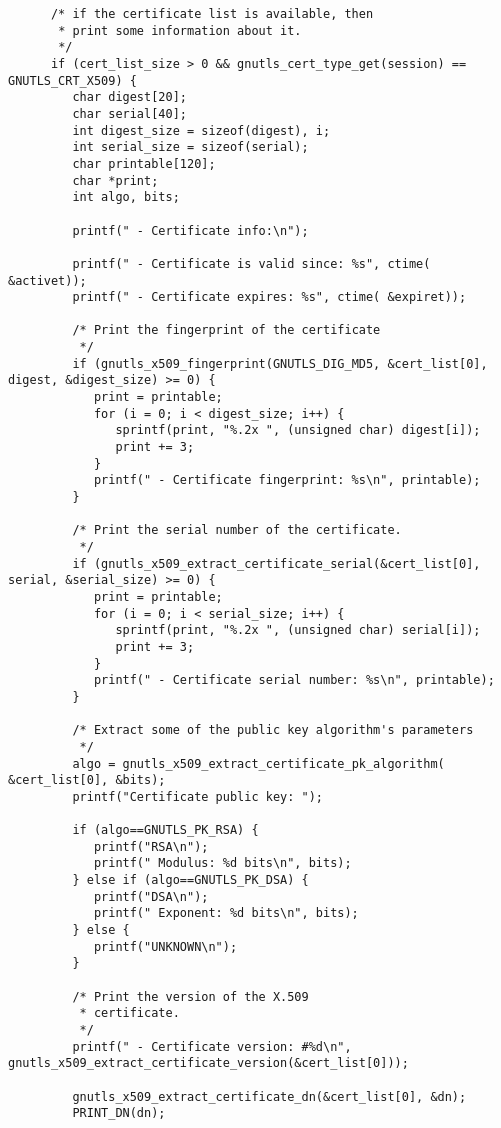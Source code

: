 \begin{verbatim}
      /* if the certificate list is available, then
       * print some information about it.
       */
      if (cert_list_size > 0 && gnutls_cert_type_get(session) == GNUTLS_CRT_X509) {
         char digest[20];
         char serial[40];
         int digest_size = sizeof(digest), i;
         int serial_size = sizeof(serial);
         char printable[120];
         char *print;
         int algo, bits;

         printf(" - Certificate info:\n");

         printf(" - Certificate is valid since: %s", ctime( &activet));
         printf(" - Certificate expires: %s", ctime( &expiret));

         /* Print the fingerprint of the certificate
          */
         if (gnutls_x509_fingerprint(GNUTLS_DIG_MD5, &cert_list[0], digest, &digest_size) >= 0) {
            print = printable;
            for (i = 0; i < digest_size; i++) {
               sprintf(print, "%.2x ", (unsigned char) digest[i]);
               print += 3;
            }
            printf(" - Certificate fingerprint: %s\n", printable);
         }

         /* Print the serial number of the certificate.
          */
         if (gnutls_x509_extract_certificate_serial(&cert_list[0], serial, &serial_size) >= 0) {
            print = printable;
            for (i = 0; i < serial_size; i++) {
               sprintf(print, "%.2x ", (unsigned char) serial[i]);
               print += 3;
            }
            printf(" - Certificate serial number: %s\n", printable);
         }

         /* Extract some of the public key algorithm's parameters
          */
         algo = gnutls_x509_extract_certificate_pk_algorithm( &cert_list[0], &bits);
         printf("Certificate public key: ");

         if (algo==GNUTLS_PK_RSA) {
            printf("RSA\n");
            printf(" Modulus: %d bits\n", bits);
         } else if (algo==GNUTLS_PK_DSA) {
            printf("DSA\n");
            printf(" Exponent: %d bits\n", bits);
         } else {
            printf("UNKNOWN\n");
         }

         /* Print the version of the X.509 
          * certificate.
          */
         printf(" - Certificate version: #%d\n", gnutls_x509_extract_certificate_version(&cert_list[0]));

         gnutls_x509_extract_certificate_dn(&cert_list[0], &dn);
         PRINT_DN(dn);


\end{verbatim}
